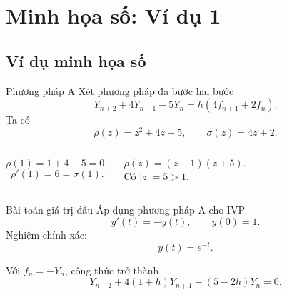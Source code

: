 \documentclass[aspectratio=43]{beamer}
\begin{document}
\section{Minh họa số: Ví dụ 1}
\subsection*{Ví dụ minh họa số}
\begin{frame}
\begin{vidu}{Phương pháp A}
Xét phương pháp đa bước hai bước
\[
 Y_{n+2}+4Y_{n+1}-5Y_n=h(4f_{n+1}+2f_n).
\]
Ta có
\[
 \rho(z)=z^2+4z-5,
 \qquad
 \sigma(z)=4z+2.
\]
\end{vidu}
\begin{columns}[T]
\begin{tcolorbox}[title={Nhất quán}, colback=softgreen, colframe=tealgreen, colbacktitle=tealgreen]
\[
\rho(1)=1+4-5=0,
\]
\[
\rho'(1)=6=\sigma(1).
\]
\end{tcolorbox}
\begin{tcolorbox}[title={Tính 0-ổn định}, colback=softred, colframe=warnred, colbacktitle=warnred]
\[
\rho(z)=(z-1)(z+5).
\]
 Có $|z|=5>1$.
\end{tcolorbox}
\end{columns}
\end{frame}

\begin{frame}
\begin{vidu}{Bài toán giá trị đầu}
Áp dụng phương pháp A cho IVP
\[
 y'(t)=-y(t),
 \qquad
 y(0)=1.
\]
Nghiệm chính xác:
\[
 y(t)=e^{-t}.
\]
\end{vidu}
\begin{tcolorbox}[title={Thay vào công thức}, colback=softgreen, colframe=tealgreen, colbacktitle=tealgreen]
Với $f_n= -Y_n$, công thức trở thành
\[
 Y_{n+2}+4(1+h)Y_{n+1}-(5-2h)Y_n=0.
\]
\end{tcolorbox}
\end{frame}
\end{document}
